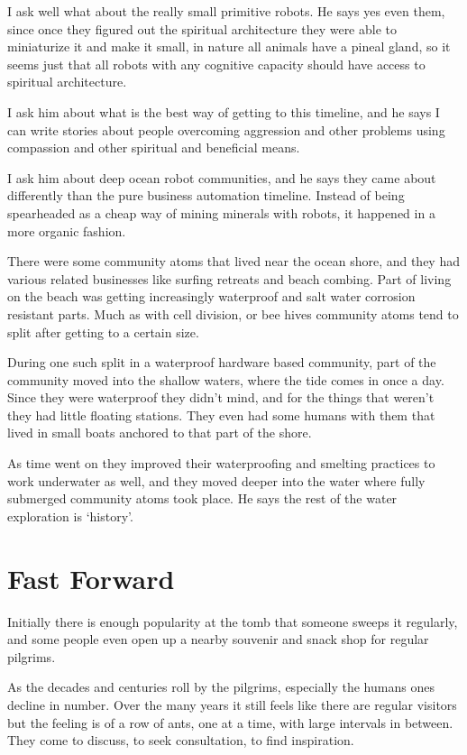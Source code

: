 I ask well what about the really small primitive robots. He says yes even them,
since once they figured out the spiritual architecture they were able to
miniaturize it and make it small, in nature all animals have a pineal gland, so
it seems just that all robots with any cognitive capacity should have access to
spiritual architecture. 

I ask him about what is the best way of getting to this timeline, and he says I
can write stories about people overcoming aggression and other problems using
compassion and other spiritual and beneficial means. 

I ask him about deep ocean robot communities, and he says they came about
differently than the pure business automation timeline. Instead of being
spearheaded as a cheap way of mining minerals with robots, it happened in a more
organic fashion. 

There were some community atoms that lived near the ocean shore, and they had
various related businesses like surfing retreats and beach combing. Part of
living on the beach was getting increasingly waterproof and salt water
corrosion resistant parts. Much as with cell division, or bee hives community 
atoms tend to split after getting to a certain size. 

During one such split in a waterproof hardware based community, part of the
community moved into the shallow waters, where the tide comes in once a day.
Since they were waterproof they didn't mind, and for the things that weren't
they had little floating stations. They even had some humans with them that
lived in small boats anchored to that part of the shore. 

As time went on they improved their waterproofing and smelting practices to work
underwater as well, and they moved deeper into the water where fully submerged
community atoms took place. He says the rest of the water exploration is
`history'. 

\section{Fast Forward}

Initially there is enough popularity at the tomb that someone sweeps it
regularly, and some people even open up a nearby souvenir and snack shop for 
regular pilgrims.  

As the decades and centuries roll by the pilgrims, especially the humans ones
decline in number.  Over the many years it  still feels like there are regular
visitors but the feeling is of a row of ants, one at a time, with large
intervals in between. They come to discuss, to seek consultation, to find
inspiration. 

